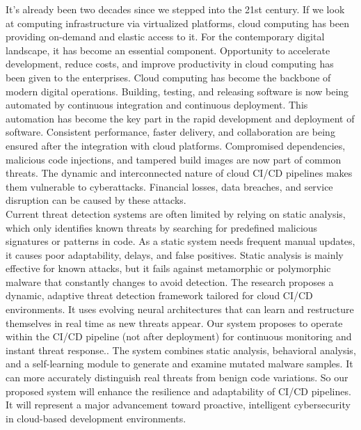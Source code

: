 It’s already been two decades since we stepped into the 21st century.  If we look at computing infrastructure via virtualized platforms, cloud computing has been providing on-demand and elastic access to it. For the contemporary digital landscape, it has become an essential component. Opportunity to accelerate development, reduce costs, and improve productivity in cloud computing has been given to the enterprises. Cloud computing has become the backbone of modern digital operations. Building, testing, and releasing software is now being automated by continuous integration and continuous deployment. This automation has become the key part in the rapid development and deployment of software. Consistent performance, faster delivery, and collaboration are being ensured after the integration with cloud platforms. Compromised dependencies, malicious code injections, and tampered build images are now part of common threats. The dynamic and interconnected nature of cloud CI/CD pipelines makes them vulnerable to cyberattacks. Financial losses, data breaches, and service disruption can be caused by these attacks.\\

Current threat detection systems are often limited by relying on static analysis, which only identifies known threats by searching for predefined malicious signatures or patterns in code. As a static system needs frequent manual updates, it causes poor adaptability, delays, and false positives. Static analysis is mainly effective for known attacks, but it fails against metamorphic or polymorphic malware that constantly changes to avoid detection. The research proposes a dynamic, adaptive threat detection framework tailored for cloud CI/CD environments. It uses evolving neural architectures that can learn and restructure themselves in real time as new threats appear. Our system proposes to operate within the CI/CD pipeline (not after deployment) for continuous monitoring and instant threat response.. The system combines static analysis, behavioral analysis, and a self-learning module to generate and examine mutated malware samples. It can more accurately distinguish real threats from benign code variations. So our proposed system will enhance the resilience and adaptability of CI/CD pipelines. It will represent a major advancement toward proactive, intelligent cybersecurity in cloud-based development environments.


